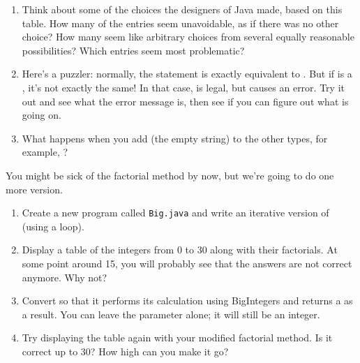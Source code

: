 \begin{exercise}
\begin{enumerate}
\item Think about some of the choices the designers of Java made, based on this table.
How many of the entries seem unavoidable, as if there was no other choice?
How many seem like arbitrary choices from several equally reasonable possibilities?
Which entries seem most problematic?

\item Here's a puzzler: normally, the statement  is exactly equivalent to .
But if  is a , it's not exactly the same!
In that case,  is legal, but  causes an error.
Try it out and see what the error message is, then see if you can figure out what is going on.

\item What happens when you add  (the empty string) to the other types, for example, ?


\end{enumerate}

\end{exercise}


\begin{exercise}  %


You might be sick of the factorial method by now, but we're going to do one more version.

\begin{enumerate}

\item Create a new program called {\tt Big.java} and write an iterative version of  (using a  loop).

\item Display a table of the integers from 0 to 30 along with their factorials.
At some point around 15, you will probably see that the answers are not correct anymore.
Why not?

\item Convert  so that it performs its calculation using BigIntegers and returns a  as a result.
You can leave the parameter alone; it will still be an integer.

\item Try displaying the table again with your modified factorial method.
Is it correct up to 30?
How high can you make it go?

\end{enumerate}

\end{exercise}


